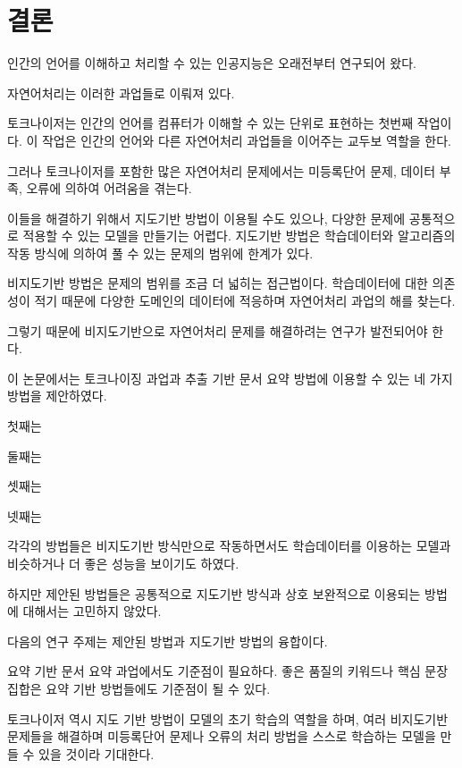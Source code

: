 \documentclass[11pt]{article}
\begin{document}
\newpage
\section{결론} \label{conclusion}

인간의 언어를 이해하고 처리할 수 있는 인공지능은 오래전부터 연구되어 왔다.

자연어처리는 이러한 과업들로 이뤄져 있다.

토크나이저는 인간의 언어를 컴퓨터가 이해할 수 있는 단위로 표현하는 첫번째 작업이다.
이 작업은 인간의 언어와 다른 자연어처리 과업들을 이어주는 교두보 역할을 한다.

그러나 토크나이저를 포함한 많은 자연어처리 문제에서는 미등록단어 문제, 데이터 부족, 오류에 의하여 어려움을 겪는다.

이들을 해결하기 위해서 지도기반 방법이 이용될 수도 있으나, 다양한 문제에 공통적으로 적용할 수 있는 모델을 만들기는 어렵다.
지도기반 방법은 학습데이터와 알고리즘의 작동 방식에 의하여 풀 수 있는 문제의 범위에 한계가 있다.

비지도기반 방법은 문제의 범위를 조금 더 넓히는 접근법이다.
학습데이터에 대한 의존성이 적기 때문에 다양한 도메인의 데이터에 적응하며 자연어처리 과업의 해를 찾는다.

그렇기 때문에 비지도기반으로 자연어처리 문제를 해결하려는 연구가 발전되어야 한다.


이 논문에서는 토크나이징 과업과 추출 기반 문서 요약 방법에 이용할 수 있는 네 가지 방법을 제안하였다.

첫째는

둘째는

셋째는

넷째는

각각의 방법들은 비지도기반 방식만으로 작동하면서도 학습데이터를 이용하는 모델과 비슷하거나 더 좋은 성능을 보이기도 하였다.

하지만 제안된 방법들은 공통적으로 지도기반 방식과 상호 보완적으로 이용되는 방법에 대해서는 고민하지 않았다.

다음의 연구 주제는 제안된 방법과 지도기반 방법의 융합이다.

요약 기반 문서 요약 과업에서도 기준점이 필요하다. 좋은 품질의 키워드나 핵심 문장 집합은 요약 기반 방법들에도 기준점이 될 수 있다.

토크나이저 역시 지도 기반 방법이 모델의 초기 학습의 역할을 하며, 여러 비지도기반 문제들을 해결하며 미등록단어 문제나 오류의 처리 방법을 스스로 학습하는 모델을 만들 수 있을 것이라 기대한다.




\vspace{3cm}

\newpage

\end{document}
